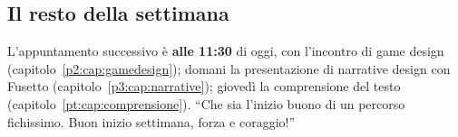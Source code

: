 \subsection{Il resto della settimana}

L'appuntamento successivo è \textbf{alle 11:30} di oggi, con l'incontro di
game design (capitolo~\ref{p2:cap:gamedesign}); domani la presentazione di
narrative design con Fusetto (capitolo~\ref{p3:cap:narrative}); giovedì la
comprensione del testo (capitolo~\ref{pt:cap:comprensione}). ``Che sia l'inizio buono di un percorso fichissimo.
Buon inizio settimana, forza e coraggio!''

